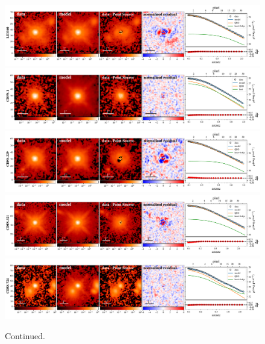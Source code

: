 \documentclass[apj]{emulateapj}
\begin{document}
\begin{figure}
\centering
{
\includegraphics[height=0.25\textwidth]{fig/best_fit_LID360_SB_profile.pdf}
\includegraphics[height=0.25\textwidth]{fig/best_fit_CDFS-1_SB_profile.pdf}
\includegraphics[height=0.25\textwidth]{fig/best_fit_CDFS-229_SB_profile.pdf}
\includegraphics[height=0.25\textwidth]{fig/best_fit_CDFS-321_SB_profile.pdf}
\includegraphics[height=0.25\textwidth]{fig/best_fit_CDFS-724_SB_profile.pdf}
}
\caption{Continued.}
\end{figure} 
\end{document}
